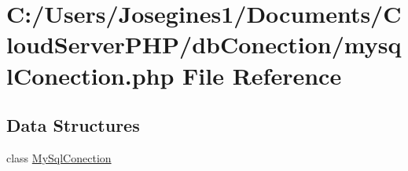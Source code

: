\hypertarget{mysql_conection_8php}{}\section{C\+:/\+Users/\+Josegines1/\+Documents/\+Cloud\+Server\+P\+H\+P/db\+Conection/mysql\+Conection.php File Reference}
\label{mysql_conection_8php}
\subsection*{Data Structures}
\begin{DoxyCompactItemize}
\item 
class \mbox{\hyperlink{class_my_sql_conection}{My\+Sql\+Conection}}
\end{DoxyCompactItemize}
